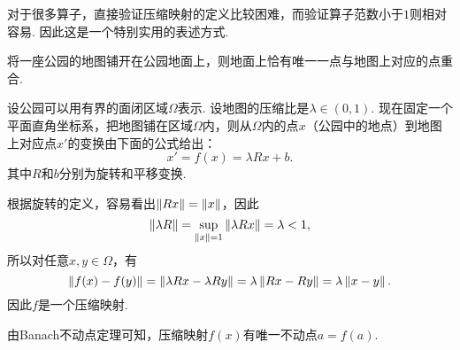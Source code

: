 对于很多算子，直接验证压缩映射的定义比较困难，而验证算子范数小于$1$则相对容易. 因此这是一个特别实用的表述方式. 

\begin{example}[落在地面上的地图]
将一座公园的地图铺开在公园地面上，则地面上恰有唯一一点与地图上对应的点重合. 

设公园可以用有界的面闭区域$\Omega$表示. 设地图的压缩比是$\lambda\in(0,1)$. 现在固定一个平面直角坐标系，把地图铺在区域$\Omega$内，则从$\Omega$内的点$x$（公园中的地点）到地图上对应点$x'$的变换由下面的公式给出：
\[x' = f(x) = \lambda Rx + b.\]
其中$R$和$b$分别为旋转和平移变换. 

根据旋转的定义，容易看出$\left\|Rx\right\|=\left\|x\right\|$，因此
\[\left\|\lambda R\right\|=\sup_{\left\|x\right\|=1}\left\|\lambda Rx\right\|=\lambda<1,\]
所以对任意$x,y\in\Omega$，有
\[\left\|f(x)-f(y)\right\|=\left\|\lambda Rx-\lambda Ry\right\|=\lambda\left\|Rx-Ry\right\|= \lambda\left\|x-y\right\|.\]
因此$f$是一个压缩映射.

由Banach不动点定理可知，压缩映射$f(x)$有唯一不动点$a=f(a)$.
\end{example}

